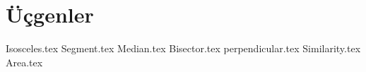 \section{Üçgenler}
{Isosceles.tex}
{Segment.tex}
{Median.tex}
{Bisector.tex}
{perpendicular.tex}
{Similarity.tex}
{Area.tex}